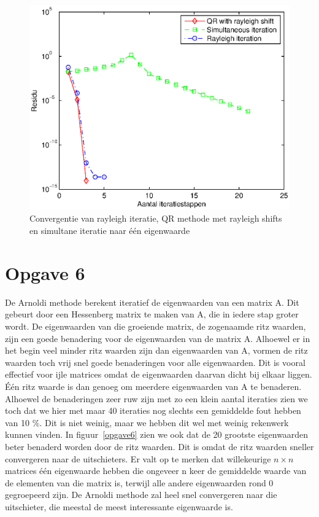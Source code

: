 \documentclass[]{article}
\newcommand{\opgave}[1]{\pagebreak\section*{Opgave #1}}
\begin{document}
\begin{figure}[h]
\noindent \includegraphics[width=1\linewidth]{opgave5.eps}
\caption{Convergentie van rayleigh iteratie, QR methode met rayleigh shifts en simultane iteratie naar \'{e}\'{e}n eigenwaarde}
\label{opgave5}
\end{figure}

\opgave{6}

De Arnoldi methode berekent iteratief de eigenwaarden van een matrix A. Dit gebeurt door een Hessenberg matrix te maken van A, die in iedere stap groter wordt. De eigenwaarden van die groeiende matrix, de zogenaamde ritz waarden, zijn een goede benadering voor de eigenwaarden van de matrix A. Alhoewel er in het begin veel minder ritz waarden zijn dan eigenwaarden van A, vormen de ritz waarden toch vrij snel goede benaderingen voor alle eigenwaarden. Dit is vooral effectief voor ijle matrices omdat de eigenwaarden daarvan dicht bij elkaar liggen. \'{E}\'{e}n ritz waarde is dan genoeg om meerdere eigenwaarden van A te benaderen. Alhoewel de benaderingen zeer ruw zijn met zo een klein aantal iteraties zien we toch dat we hier met maar 40 iteraties nog slechts een gemiddelde fout hebben van 10 $\%$. Dit is niet weinig, maar we hebben dit wel met weinig rekenwerk kunnen vinden. In figuur~\ref{opgave6} zien we ook dat de 20 grootste eigenwaarden beter benaderd worden door de ritz waarden. Dit is omdat de ritz waarden sneller convergeren naar de uitschieters. 
\linebreak Er valt op te merken dat willekeurige $n\times n$ matrices \'{e}\'{e}n eigenwaarde hebben die ongeveer n keer de gemiddelde waarde van de elementen van die matrix is, terwijl alle andere eigenwaarden rond 0 gegroepeerd zijn. De Arnoldi methode zal heel snel convergeren naar die uitschieter, die meestal de meest interessante eigenwaarde is. 
\end{document}
